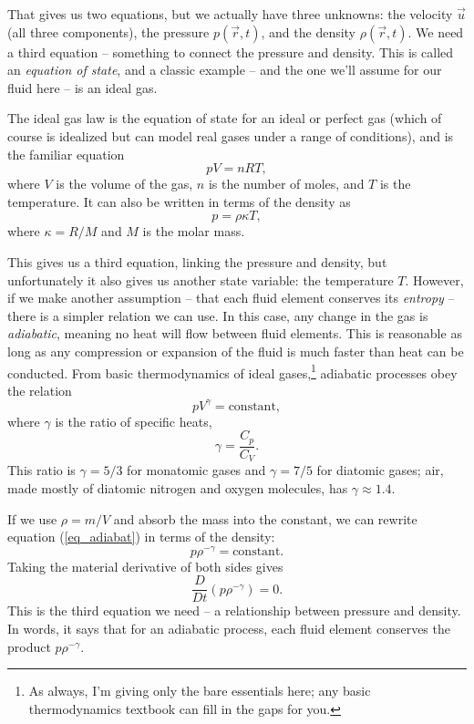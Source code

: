 That gives us two equations, but we actually have three unknowns:  the velocity $\vec{u}$ (all three components), the pressure $p(\vec{r}, t)$, and the density $\rho(\vec{r}, t)$.  We need a third equation -- something to connect the pressure and density.  This is called an \emph{equation of state}, and a classic example -- and the one we'll assume for our fluid here -- is an ideal gas.

The ideal gas law is the equation of state for an ideal or perfect gas (which of course is idealized but can model real gases under a range of conditions), and is the familiar equation
\[
pV = nRT,
\]
where $V$ is the volume of the gas, $n$ is the number of moles, and $T$ is the temperature.  It can also be written in terms of the density as
\begin{equation}
p = \rho \kappa T,
\end{equation}
where $\kappa = R/M$ and $M$ is the molar mass.

This gives us a third equation, linking the pressure and density, but unfortunately it also gives us another state variable:  the temperature $T$.  However, if we make another assumption -- that each fluid element conserves its \emph{entropy} -- there is a simpler relation we can use.  In this case, any change in the gas is \emph{adiabatic}, meaning no heat will flow between fluid elements.  This is reasonable as long as any compression or expansion of the fluid is much faster than heat can be conducted.  From basic thermodynamics of ideal gases,\footnote{As always, I'm giving only the bare essentials here; any basic thermodynamics textbook can fill in the gaps for you.} adiabatic processes obey the relation
\begin{equation}
\label{eq_adiabat}
pV^\gamma = \text{constant},
\end{equation}
where $\gamma$ is the ratio of specific heats,
\[
\gamma = \frac{C_p}{C_V}.
\]
This ratio is $\gamma = 5/3$ for monatomic gases and $\gamma = 7/5$ for diatomic gases; air, made mostly of diatomic nitrogen and oxygen molecules, has $\gamma \approx 1.4$.

If we use $\rho = m/V$ and absorb the mass into the constant, we can rewrite equation (\ref{eq_adiabat}) in terms of the density:
\[
p\rho^{-\gamma} = \text{constant}.
\]
Taking the material derivative of both sides gives
\begin{equation}
\frac{D}{Dt} \left( p \rho^{-\gamma} \right) = 0.
\end{equation}
This is the third equation we need -- a relationship between pressure and density.  In words, it says that for an adiabatic process, each fluid element conserves the product $p\rho^{-\gamma}$.


